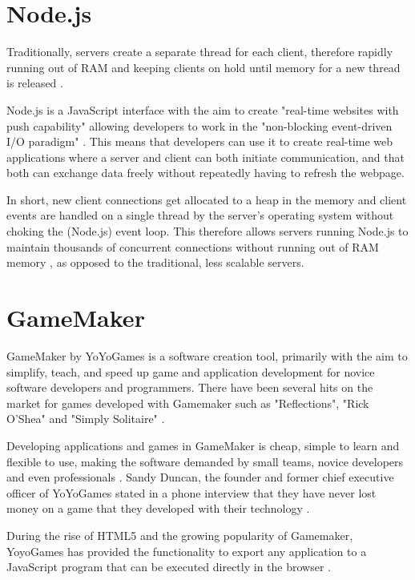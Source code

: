 \documentclass[bsc,frontabs,twoside,singlespacing,parskip,deptreport]{infthesis}     %
\begin{document}
\section{Node.js}
Traditionally, servers create a separate thread for each client, therefore rapidly running out of RAM and keeping clients on hold until memory for a new thread is released \cite{Why_Nodejs}.

Node.js is a JavaScript interface with the aim to create "real-time websites with push capability" allowing developers to work in the "non-blocking event-driven I/O paradigm" \cite{Why_Nodejs}. This means that developers can use it to create real-time web applications where a server and client can both initiate communication, and that both can exchange data freely without repeatedly having to refresh the webpage.

In short, new client connections get allocated to a heap in the memory and client events are handled on a single thread by the server's operating system without choking the (Node.js) event loop. This therefore allows servers running Node.js to maintain thousands of concurrent connections without running out of RAM memory \cite{Node_Stress_Test, NodeJS_Image}, as opposed to the traditional, less scalable servers.


\section{GameMaker}
GameMaker by YoYoGames is a software creation tool, primarily with the aim to simplify, teach, and speed up game and application development for novice software developers and programmers. There have been several hits on the market for games developed with Gamemaker such as "Reflections", "Rick O'Shea" and "Simply Solitaire" \cite{Gamemaker_DnD}.

Developing applications and games in GameMaker is cheap, simple to learn and flexible to use, making the software demanded by small teams, novice developers and even professionals \cite{Mark_Overmars}. Sandy Duncan, the founder and former chief executive officer of YoYoGames stated in a phone interview that they have never lost money on a game that they developed with their technology \cite{Gamemaker_DnD}.

During the rise of HTML5 and the growing popularity of Gamemaker, YoyoGames has provided the functionality to export any application to a JavaScript program that can be executed directly in the browser \cite{GameMaker_Studio}.
\end{document}
